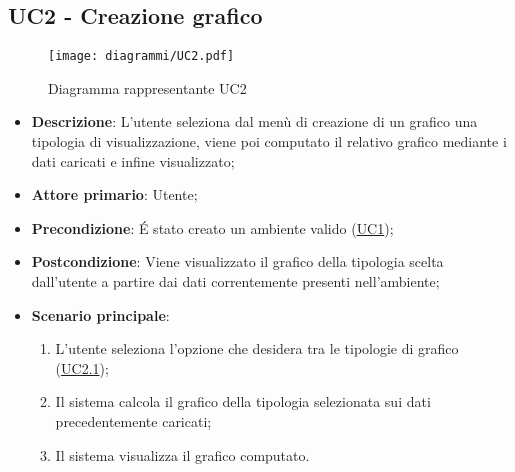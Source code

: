 \subsection{UC2 - Creazione grafico}
\label{sub:uc2}

\begin{figure}[h]
    \centering
    \texttt{[image: diagrammi/UC2.pdf]}
    \caption{Diagramma rappresentante UC2}
    \label{fig:UC2}
\end{figure}


\begin{itemize}
	\item \textbf{Descrizione}: L’utente seleziona dal menù di creazione di un grafico una tipologia di 
	visualizzazione, viene poi computato il relativo grafico mediante i dati caricati e infine visualizzato;
	
    \item \textbf{Attore primario}: Utente;
    
    \item \textbf{Precondizione}:   É stato creato un ambiente valido (\hyperref[sub:uc1]{UC1});

	\item \textbf{Postcondizione}:  Viene visualizzato il grafico della tipologia scelta dall'utente a partire dai dati 
	correntemente presenti nell'ambiente; 

	\item \textbf{Scenario principale}:
		\begin{enumerate}
			\item L'utente seleziona l'opzione che desidera tra le tipologie di grafico (\hyperref[ssub:uc2.1]{UC2.1});
			\item Il sistema calcola il grafico della tipologia selezionata sui dati precedentemente caricati;
			\item Il sistema visualizza il grafico computato.
		\end{enumerate}
\end{itemize}

